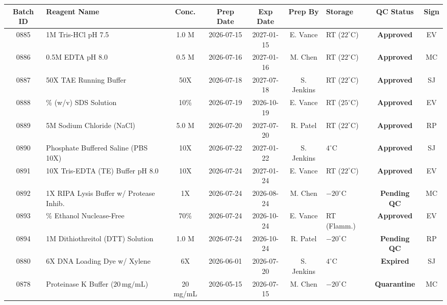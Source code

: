 \documentclass[10pt,a4paper]{article}
\begin{document}
\vspace{4pt}

{\small
\begin{tabularx}{\textwidth}{@{}c>{\raggedright\arraybackslash}Xcccc>{\centering\arraybackslash}Xcc@{}}
  \toprule
  \rowcolor{labnavy}
  \color{white}\textbf{Batch ID} & \color{white}\textbf{Reagent Name} & \color{white}\textbf{Conc.} & \color{white}\textbf{Prep Date} & \color{white}\textbf{Exp Date} & \color{white}\textbf{Prep By} & \color{white}\textbf{Storage} & \color{white}\textbf{QC Status} & \color{white}\textbf{Sign} \\
  \midrule
  \rowcolor{white}
  0885 & 1M Tris-HCl pH 7.5 & 1.0 M & 2026-07-15 & 2027-01-15 & E. Vance & RT ($22^\circ\text{C}$) & \color{labgreen}\textbf{Approved} & EV \\
  \rowcolor{labbg}
  0886 & 0.5M EDTA pH 8.0 & 0.5 M & 2026-07-16 & 2027-01-16 & M. Chen & RT ($22^\circ\text{C}$) & \color{labgreen}\textbf{Approved} & MC \\
  \rowcolor{white}
  0887 & 50X TAE Running Buffer & 50X & 2026-07-18 & 2027-07-18 & S. Jenkins & RT ($22^\circ\text{C}$) & \color{labgreen}\textbf{Approved} & SJ \\
  \rowcolor{labbg}
  0888 & 10\% (w/v) SDS Solution & 10\% & 2026-07-19 & 2026-10-19 & E. Vance & RT ($25^\circ\text{C}$) & \color{labgreen}\textbf{Approved} & EV \\
  \rowcolor{white}
  0889 & 5M Sodium Chloride (NaCl) & 5.0 M & 2026-07-20 & 2027-07-20 & R. Patel & RT ($22^\circ\text{C}$) & \color{labgreen}\textbf{Approved} & RP \\
  \rowcolor{labbg}
  0890 & Phosphate Buffered Saline (PBS 10X) & 10X & 2026-07-22 & 2027-01-22 & S. Jenkins & $4^\circ\text{C}$ & \color{labgreen}\textbf{Approved} & SJ \\
  \rowcolor{white}
  0891 & 10X Tris-EDTA (TE) Buffer pH 8.0 & 10X & 2026-07-24 & 2027-01-24 & E. Vance & RT ($22^\circ\text{C}$) & \color{labgreen}\textbf{Approved} & EV \\
  \rowcolor{labbg}
  0892 & 1X RIPA Lysis Buffer w/ Protease Inhib. & 1X & 2026-07-24 & 2026-08-24 & M. Chen & $-20^\circ\text{C}$ & \color{labamber}\textbf{Pending QC} & MC \\
  \rowcolor{white}
  0893 & 70\% Ethanol Nuclease-Free & 70\% & 2026-07-24 & 2026-10-24 & E. Vance & RT (Flamm.) & \color{labgreen}\textbf{Approved} & EV \\
  \rowcolor{labbg}
  0894 & 1M Dithiothreitol (DTT) Solution & 1.0 M & 2026-07-24 & 2026-10-24 & R. Patel & $-20^\circ\text{C}$ & \color{labamber}\textbf{Pending QC} & RP \\
  \rowcolor{white}
  0880 & 6X DNA Loading Dye w/ Xylene & 6X & 2026-06-01 & 2026-07-20 & S. Jenkins & $4^\circ\text{C}$ & \color{labred}\textbf{Expired} & SJ \\
  \rowcolor{labbg}
  0878 & Proteinase K Buffer ($20\,\text{mg/mL}$) & 20 mg/mL & 2026-05-15 & 2026-07-15 & M. Chen & $-20^\circ\text{C}$ & \color{labred}\textbf{Quarantine} & MC \\
  \bottomrule
\end{tabularx}
}
\end{document}
